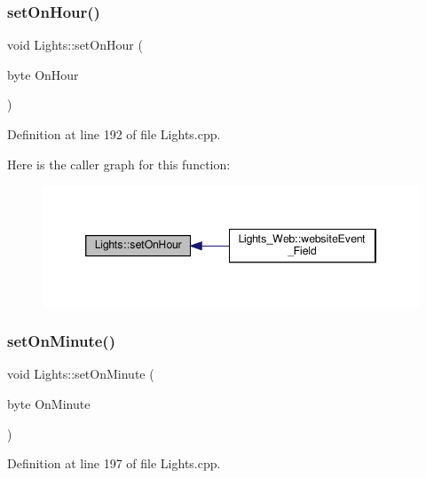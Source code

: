 \subsubsection{\texorpdfstring{set\+On\+Hour()}{setOnHour()}\hspace{0.1cm}{\footnotesize\ttfamily [2/2]}}
{\footnotesize\ttfamily void Lights\+::set\+On\+Hour (\begin{DoxyParamCaption}\item[{byte}]{On\+Hour }\end{DoxyParamCaption})\hspace{0.3cm}{\ttfamily [protected]}}



Definition at line 192 of file Lights.\+cpp.

Here is the caller graph for this function\+:
\nopagebreak
\begin{figure}[H]
\begin{center}
\leavevmode
\includegraphics[width=346pt]{class_lights_ad95bf16e17afbf909d480e995a3c214f_icgraph}
\end{center}
\end{figure}
\mbox{\label{class_lights_a809f813dc9401c658869b44b44beac75}} 
\subsubsection{\texorpdfstring{set\+On\+Minute()}{setOnMinute()}\hspace{0.1cm}{\footnotesize\ttfamily [1/2]}}
{\footnotesize\ttfamily void Lights\+::set\+On\+Minute (\begin{DoxyParamCaption}\item[{byte}]{On\+Minute }\end{DoxyParamCaption})\hspace{0.3cm}{\ttfamily [protected]}}



Definition at line 197 of file Lights.\+cpp.

